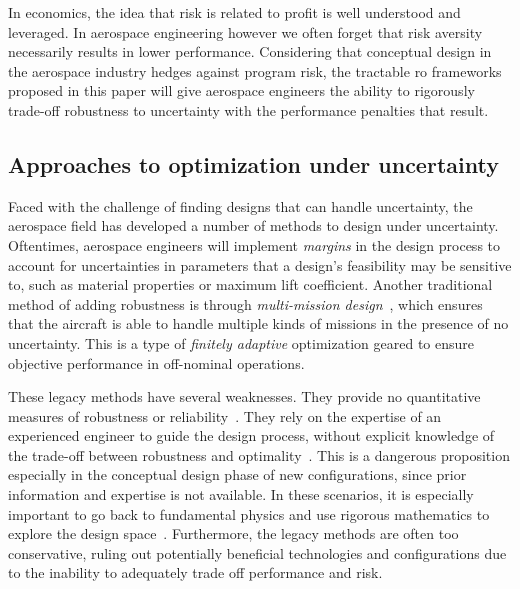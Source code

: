 In economics, the idea that risk is related to profit is well understood and leveraged.
In aerospace engineering however we often forget that risk aversity necessarily results in lower performance.
Considering that conceptual design in the aerospace industry hedges against program risk,
the tractable \gls{ro} frameworks proposed in this paper will
give aerospace engineers the ability to rigorously trade-off robustness to uncertainty with the performance penalties
that result.

\subsection{Approaches to optimization under uncertainty}
\label{sec:approaches}

Faced with the challenge of finding designs that can handle uncertainty,
the aerospace field has developed a number of methods to
design under uncertainty. Oftentimes, aerospace engineers will implement
\emph{margins} in the design process to account for uncertainties in parameters that a design's feasibility
may be sensitive to, such as material properties or maximum lift coefficient.
Another traditional method of adding robustness is through \emph{multi-mission design}~\cite{York2018},
which ensures that the aircraft is able to handle
multiple kinds of missions in the presence of no uncertainty. This is a type of \emph{finitely
adaptive} optimization geared to ensure objective performance in off-nominal operations.

These legacy methods have several weaknesses. They provide no quantitative measures of
robustness or reliability~\cite{Zang2002}. They rely on the expertise of an experienced
engineer to guide the design process, without explicit knowledge of the trade-off between
robustness and optimality~\cite{Yao2011}. This is a dangerous proposition especially in the
conceptual design phase of new configurations, since prior information and expertise is not
available. In these scenarios, it is especially important to go back to fundamental physics
and use rigorous mathematics to explore the design space~\cite{York2018}. Furthermore,
the legacy methods are often too conservative, ruling out potentially beneficial technologies
and configurations due to the inability to adequately trade off performance and risk.

